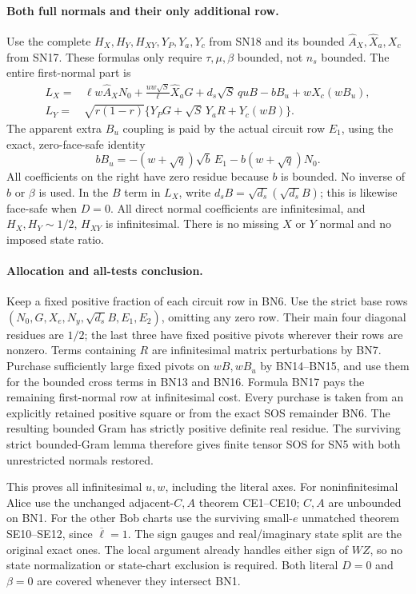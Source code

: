 \paragraph{Both full normals and their only additional row.}
Use the complete $H_X,H_Y,H_{XY},Y_P,Y_a,Y_c$ from SN18 and its
bounded $\widehat A_X,\widehat X_a,X_c$ from SN17. These formulas
only require $\tau,\mu,\beta$ bounded, not $n_s$ bounded.
The entire first-normal part is
\[
\begin{split}
 L_X={}&\ell w\widehat A_XN_0
       +\frac{uw\sqrt S}{\ell}\widehat X_aG
       +d_s\sqrt S\,quB-bB_u+wX_c(wB_u),\\
 L_Y={}&\sqrt{r(1-r)}\{Y_PG+\sqrt S\,Y_aR+Y_c(wB)\}.
\end{split}\tag{BN16}
\]
The apparent extra $B_u$ coupling is paid by the actual circuit row
$E_1$, using the exact, zero-face-safe identity
\[
 bB_u=-(w+\sqrt q)\sqrt b\,E_1-b(w+\sqrt q)N_0.
 \tag{BN17}
\]
All coefficients on the right have zero residue because $b$ is
bounded. No inverse of $b$ or $\beta$ is used. In the $B$ term in
$L_X$, write $d_sB=\sqrt{d_s}(\sqrt{d_s}B)$; this is likewise
face-safe when $D=0$. All direct normal coefficients are
infinitesimal, and $H_X,H_Y\sim1/2$, $H_{XY}$ is infinitesimal.
There is no missing $X$ or $Y$ normal and no imposed state ratio.

\paragraph{Allocation and all-tests conclusion.}
Keep a fixed positive fraction of each circuit row in BN6.
Use the strict base rows $(N_0,G,X_e,N_y,\sqrt{d_s}B,E_1,E_2)$,
omitting any zero row. Their main four diagonal residues are $1/2$;
the last three have fixed positive pivots wherever their rows are
nonzero. Terms containing $R$ are infinitesimal matrix perturbations
by BN7. Purchase sufficiently large fixed pivots on $wB,wB_u$ by
BN14--BN15, and use them for the bounded cross terms in BN13 and
BN16. Formula BN17 pays the remaining first-normal row at
infinitesimal cost. Every purchase is taken from an explicitly
retained positive square or from the exact SOS remainder BN6.
The resulting bounded Gram has strictly positive definite real
residue. The surviving strict bounded-Gram lemma therefore gives
finite tensor SOS for SN5 with both unrestricted normals restored.

This proves all infinitesimal $u,w$, including the literal axes.
For noninfinitesimal Alice use the unchanged adjacent-$C,A$ theorem
CE1--CE10; $C,A$ are unbounded on BN1. For the other Bob charts use
the surviving small-$e$ unmatched theorem SE10--SE12, since
$\overline\ell=1$. The sign gauges and real/imaginary state split
are the original exact ones. The local argument already handles
either sign of $WZ$, so no state normalization or state-chart
exclusion is required. Both literal $D=0$ and $\beta=0$ are covered
whenever they intersect BN1.

